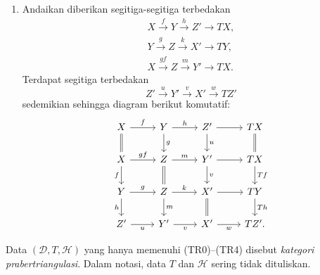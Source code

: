 \begin{definisi}
\begin{enumerate}[(TR1)]
\[\begin{tikzcd}
			X' \arrow[r] & Y' \arrow[r] & Z' \arrow[r] & TX'.
		\end{tikzcd}\]
		Jika kedua barisnya segitiga terbedakan, terdapat morfisme
		$\gamma:Z\to Z'$ seperti ditunjukkan oleh garis putus-putus sehingga
		seluruh diagram yang memuat $\alpha$, $\beta$, $\gamma$, dan $T\alpha$
		komutatif. Dengan demikian diperoleh suatu morfisme segitiga.
		\item Andaikan diberikan segitiga-segitiga terbedakan
		\begin{gather*}
			X\xrightarrow{f}Y\xrightarrow{h}Z'\to TX,\\
			Y\xrightarrow{g}Z\xrightarrow{k}X'\to TY,\\
			X\xrightarrow{gf}Z\xrightarrow{m}Y'\to TX.
		\end{gather*}
		Terdapat segitiga terbedakan
		\[ Z'\xrightarrow{u}Y'\xrightarrow{v}X'\xrightarrow{w}TZ' \]
		sedemikian sehingga diagram berikut komutatif:
		\[\begin{tikzcd}
			X \arrow[r,"f"] \arrow[equal,d] &
			Y \arrow[r,"h"] \arrow[d,"g"] &
			Z' \arrow[r] \arrow[d,"u"] & TX \arrow[equal,d] \\
			X \arrow[r,"gf"] \arrow[d,"f"'] &
			Z \arrow[r,"m"] \arrow[equal,d] &
			Y' \arrow[r] \arrow[d,"v"] & TX \arrow[d,"Tf"] \\
			Y \arrow[r,"g"] \arrow[d,"h"'] &
			Z \arrow[r,"k"] \arrow[d,"m"] &
			X' \arrow[r] \arrow[equal,d] & TY \arrow[d,"Th"] \\
			Z' \arrow[r,"u"'] & Y' \arrow[r,"v"'] &
			X' \arrow[r,"w"'] & TZ'.
		\end{tikzcd}\]
	\end{enumerate}

	Data $(\mathcal{D},T,\mathcal{H})$ yang hanya memenuhi (TR0)--(TR4)
	disebut \emph{kategori prabertriangulasi}. Dalam notasi, data $T$ dan
	$\mathcal{H}$ sering tidak dituliskan.


\end{definisi}
